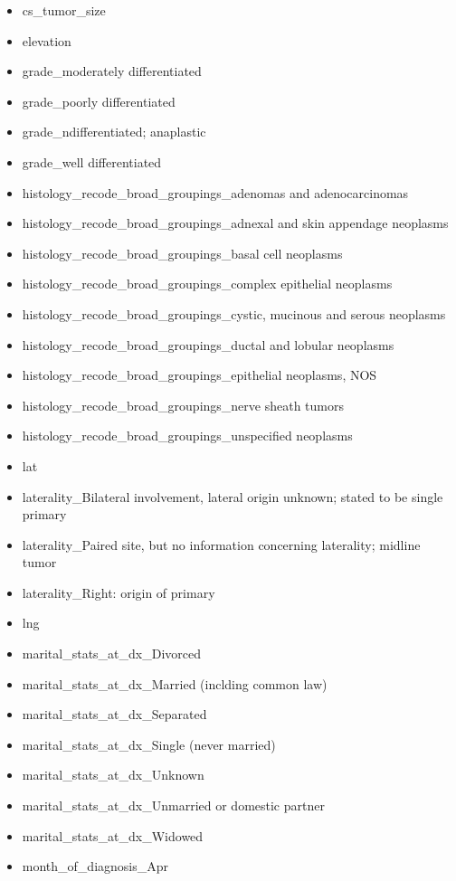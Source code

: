 \documentclass[10pt,letterpaper]{article}
\begin{document}
\begin{itemize}[noitemsep]
\item cs\_tumor\_size
\item elevation
\item grade\_moderately differentiated
\item grade\_poorly differentiated
\item grade\_ndifferentiated; anaplastic
\item grade\_well differentiated
\item histology\_recode\_broad\_groupings\_adenomas and adenocarcinomas
\item histology\_recode\_broad\_groupings\_adnexal and skin appendage neoplasms
\item histology\_recode\_broad\_groupings\_basal cell neoplasms
\item histology\_recode\_broad\_groupings\_complex epithelial neoplasms
\item histology\_recode\_broad\_groupings\_cystic, mucinous and serous neoplasms
\item histology\_recode\_broad\_groupings\_ductal and lobular neoplasms
\item histology\_recode\_broad\_groupings\_epithelial neoplasms, NOS
\item histology\_recode\_broad\_groupings\_nerve sheath tumors
\item histology\_recode\_broad\_groupings\_unspecified neoplasms
\item lat
\item laterality\_Bilateral involvement, lateral origin unknown; stated to be single primary
\item laterality\_Paired site, but no information concerning laterality; midline tumor
\item laterality\_Right: origin of primary
\item lng
\item marital\_stats\_at\_dx\_Divorced
\item marital\_stats\_at\_dx\_Married (inclding common law)
\item marital\_stats\_at\_dx\_Separated
\item marital\_stats\_at\_dx\_Single (never married)
\item marital\_stats\_at\_dx\_Unknown
\item marital\_stats\_at\_dx\_Unmarried or domestic partner
\item marital\_stats\_at\_dx\_Widowed
\item month\_of\_diagnosis\_Apr

\end{itemize}
\end{document}
